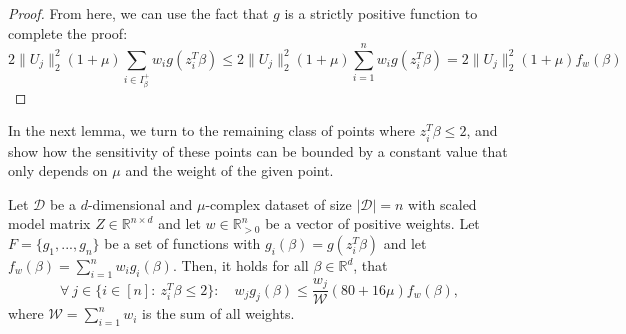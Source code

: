 \begin{proof}
    From here, we can use the fact that $g$ is a strictly positive function
    to complete the proof:
    \begin{equation*}
        2 \lVert U_j \rVert_2^2 (1 + \mu) \sum_{i \in I_\beta^+} w_i g(z_i^T \beta)
        \leq 2 \lVert U_j \rVert_2^2 (1 + \mu) \sum_{i = 1}^n w_i g(z_i^T \beta)
        = 2 \lVert U_j \rVert_2^2 (1 + \mu) f_w(\beta)
    \end{equation*}
\end{proof}

In the next lemma, we turn to the remaining class of points where
$z_i^T \beta \leq 2$, and show how the sensitivity of these points
can be bounded by a constant value that only depends on $\mu$
and the weight of the given point.

\begin{lemma}
    \label{lemma:g-bounds-2}
    Let $\mathcal{D}$ be a $d$-dimensional and $\mu$-complex dataset of size
    $|\mathcal{D}|=n$ with scaled model matrix
    $Z \in \mathbb{R}^{n \times d}$ and let $w \in \mathbb{R}^n_{>0}$
    be a vector of positive weights.
    Let $F = \{g_1, ..., g_n\}$ be a set of functions with
    $g_i(\beta) = g(z_i^T \beta)$ and let
    $f_w(\beta) = \sum_{i=1}^n w_ig_i(\beta)$.
    Then, it holds for all $\beta \in \mathbb{R}^d$, that
    \begin{equation*}
        \forall\ j \in \{i \in [n]:\ z_i^T \beta \leq 2 \}:\quad
        w_jg_j(\beta) \leq \frac{w_j}{\mathcal{W}}(80 + 16 \mu)f_w(\beta),
    \end{equation*}
    where $\mathcal{W} = \sum_{i=1}^n w_i$ is the sum of all weights.
\end{lemma}
